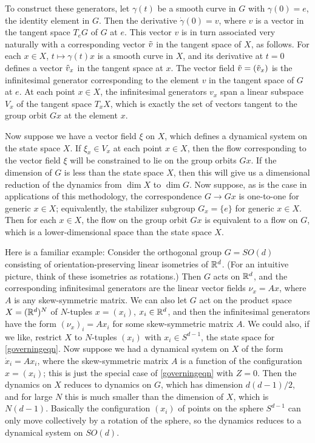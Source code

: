 \documentclass[%
 aip,
 amsmath,amssymb,
 reprint,%
]{revtex4-1}
\begin{document}
To construct these generators, let $\gamma(t)$ be a smooth curve in $G$ with $\gamma(0) = e$, the identity element in $G$. Then the derivative $\dot{\gamma}(0) = v$, where $v$ is a vector in the tangent space $T_eG$ of $G$ at $e$. This vector $v$ is in turn  associated very naturally with a corresponding vector $\Tilde{v}$  in the tangent space of $X$, as follows. For each $x \in X$, $t \mapsto \gamma(t)x$ is a smooth curve in $X$, and its derivative at $t = 0$ defines a vector $\Tilde{v}_x$ in the tangent space at $x$.  The vector field $\Tilde{v} = (\Tilde{v}_x)$ is the infinitesimal generator corresponding to the element $v$ in the tangent space of $G$ at $e$. At each point $x \in X$, the infinitesimal generators $v_x$ span a linear subspace $V_x$ of the tangent space $T_xX$, which is exactly the set of vectors tangent to the group orbit $Gx$ at the element $x$.  

Now suppose we have a vector field $\xi$ on $X$, which defines a dynamical system on the state space $X$.  If $\xi_x \in V_x$ at each point $x \in X$, then the flow corresponding to the vector field $\xi$ will be constrained to lie on the group orbits $Gx$.  If the dimension of $G$ is less than the state space $X$, then this will give us a dimensional reduction of the dynamics from $ \dim X$ to $\dim G$.  Now suppose, as is the case in applications of this methodology, the correspondence $G \to Gx$ is one-to-one for generic $x \in X$; equivalently, the stabilizer subgroup $G_x = \{e\}$ for generic $x \in X$.  Then for each $x \in X$, the flow on the group orbit $Gx$ is equivalent to a flow on $G$, which is a lower-dimensional space than the state space $X$.

Here is a familiar example: Consider the orthogonal group $G = SO(d)$ consisting of orientation-preserving linear isometries of ${\Bbb R}^d$.  (For an intuitive picture, think of these isometries as rotations.) Then $G$ acts on ${\Bbb R}^d$, and the corresponding infinitesimal generators are the linear vector fields $\nu_x = Ax$, where $A$ is any skew-symmetric matrix.  We can also let $G$ act on the product space $X = ({\Bbb R^d})^N$ of $N$-tuples $x = (x_i)$, $x_i \in {\Bbb R}^d$, and then the infinitesimal generators have the form $(\nu_x)_i = Ax_i$ for some skew-symmetric matrix $A$.  We could also, if we like, restrict $X$ to $N$-tuples $(x_i)$ with $x_i \in S^{d-1}$, the state space for \eqref{governingeqn}.  Now suppose we had a dynamical system on $X$ of the form
$\dot x_i = A x_i$, where the skew-symmetric matrix $A$ is a function of the configuration $x = (x_i)$; this is just the special case of \eqref{governingeqn} with $Z = 0$.  Then the dynamics on $X$ reduces to dynamics on $G$, which has dimension $d(d-1)/2$, and for large $N$ this is much smaller than the dimension of $X$, which is $N(d-1)$.  Basically the configuration $(x_i)$ of points on the sphere $S^{d-1}$ can only move collectively by a rotation of the sphere, so the dynamics reduces to a dynamical system on $SO(d)$.
\end{document}
